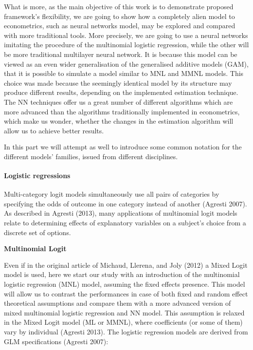 \documentclass[11pt,]{article}
\let\oldparagraph\paragraph
\renewcommand{\paragraph}[1]{\oldparagraph{#1}\mbox{}}
\begin{document}
What is more, as the main objective of this work is to demonstrate
proposed framework's flexibility, we are going to show how a completely
alien model to econometrics, such as neural networks model, may be
explored and compared with more traditional tools. More precisely, we
are going to use a neural networks imitating the procedure of the
multinomial logistic regression, while the other will be more
traditional multilayer neural network. It is because this model can be
viewed as an even wider generalisation of the generalised additive
models (GAM), that it is possible to simulate a model similar to MNL and
MMNL models. This choice was made because the seemingly identical model
by its structure may produce different results, depending on the
implemented estimation technique. The NN techniques offer us a great
number of different algorithms which are more advanced than the
algorithms traditionally implemented in econometrics, which make us
wonder, whether the changes in the estimation algorithm will allow us to
achieve better results.

In this part we will attempt as well to introduce some common notation
for the different models' families, issued from different disciplines.

\hypertarget{logistic-regressions}{%
\paragraph{Logistic regressions}\label{logistic-regressions}}

Multi-category logit models simultaneously use all pairs of categories
by specifying the odds of outcome in one category instead of another
(Agresti 2007). As described in Agresti (2013), many applications of
multinomial logit models relate to determining effects of explanatory
variables on a subject's choice from a discrete set of options.

\textbf{Multinomial Logit}

Even if in the original article of Michaud, Llerena, and Joly (2012) a
Mixed Logit model is used, here we start our study with an introduction
of the multinomial logistic regression (MNL) model, assuming the fixed
effects presence. This model will allow us to contrast the performances
in case of both fixed and random effect theoretical assumptions and
compare them with a more advanced version of mixed multinomial logistic
regression and NN model. This assumption is relaxed in the Mixed Logit
model (ML or MMNL), where coefficients (or some of them) vary by
individual (Agresti 2013). The logistic regression models are derived
from GLM specifications (Agresti 2007):
\end{document}
